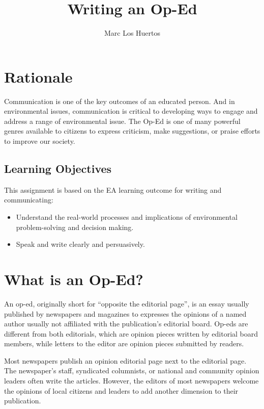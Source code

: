 \documentclass{tufte-handout}\usepackage[]{graphicx}\usepackage[]{color}
\title{Writing an Op-Ed %
}
\author[Marc Los Huertos]{Marc Los Huertos}
\begin{document}
\maketitle

\section{Rationale}

Communication is one of the key outcomes of an educated person. And in environmental issues, communication is critical to developing ways to engage and address a range of environmental issue. The Op-Ed is one of many powerful genres available to citizens to express criticism, make suggestions, or praise efforts to improve our society. 

\subsection{Learning Objectives}

This assignment is based on the EA learning outcome for writing and communicating: 

\begin{itemize}
	\item Understand the real-world processes and implications of environmental problem-solving and decision making.
	\item Speak and write clearly and persuasively.
\end{itemize}

\section{What is an Op-Ed?}

An op-ed, originally short for ``opposite the editorial page'', is an essay usually published by newspapers and magazines to expresses the opinions of a named author usually not affiliated with the publication's editorial board. Op-eds are different from both editorials, which are opinion pieces written by editorial board members, while letters to the editor are opinion pieces submitted by readers.

Most newspapers publish an opinion editorial page next to the editorial page. The newspaper's staff, syndicated columnists, or national and community opinion leaders often write the articles. However, the editors of most newspapers welcome the opinions of local citizens and leaders to add another dimension to their publication.
\end{document}

